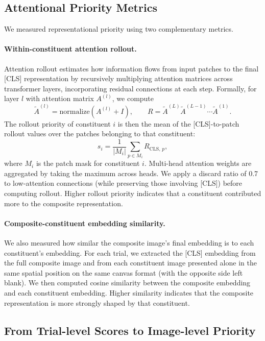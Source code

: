 \documentclass[12pt]{article}
\begin{document}
\subsection{Attentional Priority Metrics}

We measured representational priority using two complementary metrics.

\paragraph{Within-constituent attention rollout.}
Attention rollout \citep{attentionrollout_abnar2020} estimates how information flows from input patches to the final [CLS] representation by recursively multiplying attention matrices across transformer layers, incorporating residual connections at each step. Formally, for layer $l$ with attention matrix $A^{(l)}$, we compute
\[
\tilde{A}^{(l)} = \text{normalize}\!\left(A^{(l)} + I\right), \qquad R = \tilde{A}^{(L)} \tilde{A}^{(L-1)} \cdots \tilde{A}^{(1)}.
\]
The rollout priority of constituent $i$ is then the mean of the [CLS]-to-patch rollout values over the patches belonging to that constituent:
\[
s_i = \frac{1}{|M_i|} \sum_{p \in M_i} R_{\text{CLS},\, p},
\]
where $M_i$ is the patch mask for constituent $i$. Multi-head attention weights are aggregated by taking the maximum across heads. We apply a discard ratio of 0.7 to low-attention connections (while preserving those involving [CLS]) before computing rollout. Higher rollout priority indicates that a constituent contributed more to the composite representation.

\paragraph{Composite-constituent embedding similarity.}
We also measured how similar the composite image's final embedding is to each constituent's embedding. For each trial, we extracted the [CLS] embedding from the full composite image and from each constituent image presented alone in the same spatial position on the same canvas format (with the opposite side left blank). We then computed cosine similarity between the composite embedding and each constituent embedding. Higher similarity indicates that the composite representation is more strongly shaped by that constituent.

\subsection{From Trial-level Scores to Image-level Priority}
\end{document}
